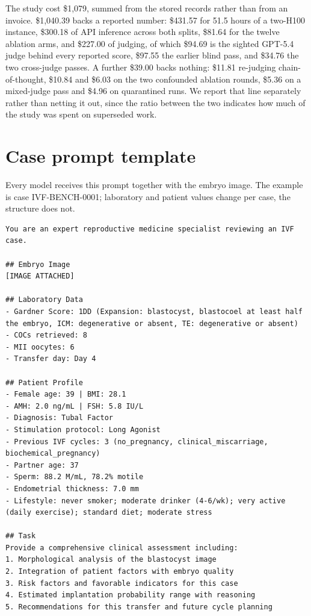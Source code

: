 \documentclass[11pt]{article}
\begin{document}
The study cost \$1,079, summed from the stored records rather than from an
invoice. \$1,040.39 backs a reported number: \$431.57 for 51.5 hours of a two-H100
instance, \$300.18 of API inference across both splits, \$81.64 for the twelve
ablation arms, and \$227.00 of judging, of which \$94.69 is the sighted GPT-5.4
judge behind every reported score, \$97.55 the earlier blind pass, and \$34.76 the
two cross-judge passes. A further \$39.00 backs nothing: \$11.81 re-judging
chain-of-thought, \$10.84 and \$6.03 on the two confounded ablation rounds, \$5.36
on a mixed-judge pass and \$4.96 on quarantined runs. We report that line
separately rather than netting it out, since the ratio between the two indicates
how much of the study was spent on superseded work.




\appendix
\section{Case prompt template}
\label{app:prompt}
Every model receives this prompt together with the embryo image. The example is case IVF-BENCH-0001; laboratory and patient values change per case, the structure does not.

\begin{lstlisting}
You are an expert reproductive medicine specialist reviewing an IVF case.

## Embryo Image
[IMAGE ATTACHED]

## Laboratory Data
- Gardner Score: 1DD (Expansion: blastocyst, blastocoel at least half the embryo, ICM: degenerative or absent, TE: degenerative or absent)
- COCs retrieved: 8
- MII oocytes: 6
- Transfer day: Day 4

## Patient Profile
- Female age: 39 | BMI: 28.1
- AMH: 2.0 ng/mL | FSH: 5.8 IU/L
- Diagnosis: Tubal Factor
- Stimulation protocol: Long Agonist
- Previous IVF cycles: 3 (no_pregnancy, clinical_miscarriage, biochemical_pregnancy)
- Partner age: 37
- Sperm: 88.2 M/mL, 78.2% motile
- Endometrial thickness: 7.0 mm
- Lifestyle: never smoker; moderate drinker (4-6/wk); very active (daily exercise); standard diet; moderate stress

## Task
Provide a comprehensive clinical assessment including:
1. Morphological analysis of the blastocyst image
2. Integration of patient factors with embryo quality
3. Risk factors and favorable indicators for this case
4. Estimated implantation probability range with reasoning
5. Recommendations for this transfer and future cycle planning
\end{lstlisting}
\end{document}
